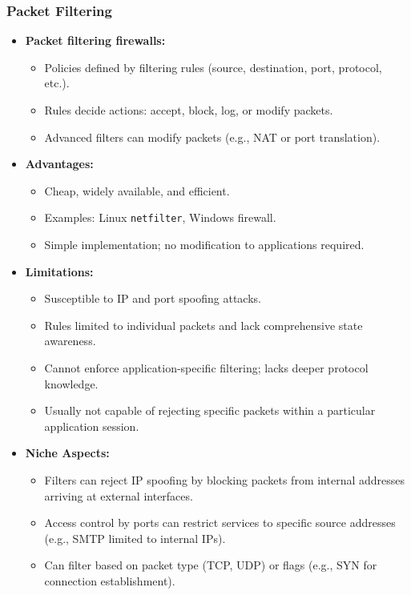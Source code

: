 \subsubsection{Packet Filtering}
\begin{itemize}
    \item \textbf{Packet filtering firewalls:}
    \begin{itemize}
        \item Policies defined by filtering rules (source, destination, port, protocol, etc.).
        \item Rules decide actions: accept, block, log, or modify packets.
        \item Advanced filters can modify packets (e.g., NAT or port translation).
    \end{itemize}

    \item \textbf{Advantages:}
    \begin{itemize}
        \item Cheap, widely available, and efficient.
        \item Examples: Linux \texttt{netfilter}, Windows firewall.
        \item Simple implementation; no modification to applications required.
    \end{itemize}

    \item \textbf{Limitations:}
    \begin{itemize}
        \item Susceptible to IP and port spoofing attacks.
        \item Rules limited to individual packets and lack comprehensive state awareness.
        \item Cannot enforce application-specific filtering; lacks deeper protocol knowledge.
        \item Usually not capable of rejecting specific packets within a particular application session.
    \end{itemize}

    \item \textbf{Niche Aspects:}
    \begin{itemize}
        \item Filters can reject IP spoofing by blocking packets from internal addresses arriving at external interfaces.
        \item Access control by ports can restrict services to specific source addresses (e.g., SMTP limited to internal IPs).
        \item Can filter based on packet type (TCP, UDP) or flags (e.g., SYN for connection establishment).
    \end{itemize}
\end{itemize}

